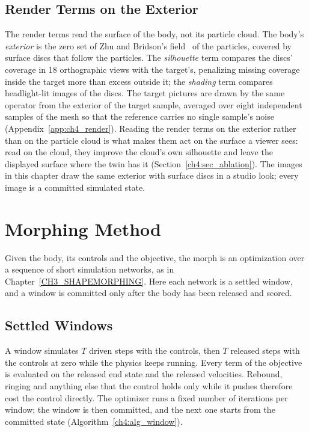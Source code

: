 \subsection{Render Terms on the Exterior}
\label{ch4:sec_exterior}
The render terms read the surface of the body, not its particle cloud. The body's \emph{exterior} is the zero set of Zhu
and Bridson's field~\citep{10.1145/1073204.1073298} of the particles, covered by surface discs that follow the particles. The
\emph{silhouette} term compares the discs' coverage in 18 orthographic views with the target's, penalizing missing
coverage inside the target more than excess outside it; the \emph{shading} term compares headlight-lit images of the
discs. The target pictures are drawn by the same operator from the exterior of the target sample, averaged over eight
independent samples of the mesh so that the reference carries no single sample's noise (Appendix~\ref{app:ch4_render}).
Reading the render terms on the exterior rather than on the particle cloud is what makes them act on the surface a viewer
sees: read on the cloud, they improve the cloud's own silhouette and leave the displayed surface where the twin has it
(Section~\ref{ch4:sec_ablation}). The images in this chapter draw the same exterior with surface discs in a studio look;
every image is a committed simulated state.

\section{Morphing Method}
\label{ch4:sec_method}

Given the body, its controls and the objective, the morph is an optimization over a sequence of short simulation
networks, as in Chapter~\ref{CH3_SHAPEMORPHING}. Here each network is a settled window, and a window is committed only
after the body has been released and scored.

\subsection{Settled Windows}
A window simulates $T$ driven steps with the controls, then $T$ released steps with the controls at zero while the
physics keeps running. Every term of the objective is evaluated on the released end state and the released velocities.
Rebound, ringing and anything else that the control holds only while it pushes therefore cost the control directly. The
optimizer runs a fixed number of iterations per window; the window is then committed, and the next one starts from the
committed state (Algorithm~\ref{ch4:alg_window}).

